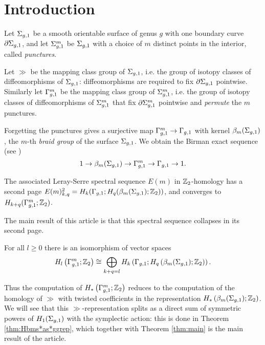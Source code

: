 \section{Introduction}
Let $\Sigma_{g,1}$ be a smooth orientable surface of genus $g$ with one boundary curve $\partial\Sigma_{g,1}$, and let $\Sigma_{g,1}^m$ be $\Sigma_{g,1}$ with
a choice of $m$ distinct points in the interior, called \emph{punctures}.

Let $\gg$ be the mapping class group of $\Sigma_{g,1}$, i.e. the group of isotopy classes of diffeomorphisms of $\Sigma_{g,1}$:
diffeomorphisms are required to fix $\partial\Sigma_{g,1}$ pointwise. Similarly let $\Gamma_{g,1}^m$ be the mapping class group of $\Sigma_{g,1}^m$, i.e.
the group of isotopy classes of diffeomorphisms of $\Sigma_{g,1}^m$ that fix $\partial\Sigma_{g,1}^m$ pointwise and \emph{permute} the $m$ punctures.

Forgetting the punctures gives a surjective map $\Gamma_{g,1}^m\to\Gamma_{g,1}$ with kernel $\beta_{m}(\Sigma_{g,1})$,
the $m$-th \emph{braid group} of the surface $\Sigma_{g,1}$. We obtain the Birman exact sequence (see \cite{Birman:mcgbr})
\begin{equation}
\label{eq:Birman}
1\to\beta_{m}(\Sigma_{g,1})\to\Gamma_{g,1}^m\to\Gamma_{g,1}\to 1.
\end{equation}

The associated Leray-Serre spectral sequence $E(m)$ in $\mathbb{Z}_2$-homology has a second page $E(m)^2_{k,q}=H_k(\Gamma_{g,1};H_q(\beta_{m}(\Sigma_{g,1});\mathbb{Z}_2))$,
and converges to $H_{k+q}(\Gamma_{g,1}^m;\mathbb{Z}_2)$.

The main result of this article is that this spectral sequence collapses in its second page.
\begin{thm}
\label{thm:main}
For all $l\geq 0$ there is an isomorphism of vector spaces
\begin{equation}
\label{eq:main}
H_l\left(\Gamma_{g,1}^m;\mathbb{Z}_2\right)\cong \bigoplus_{k+q=l} H_k\left(\Gamma_{g,1};H_q\left(\beta_{m}(\Sigma_{g,1});\mathbb{Z}_2\right)\right).
\end{equation}
\end{thm}
Thus the computation of $H_*\left(\Gamma_{g,1}^m;\mathbb{Z}_2\right)$ reduces to the computation of the homology of $\gg$ with
twisted coefficients in the representation $H_*\left(\beta_{m}(\Sigma_{g,1});\mathbb{Z}_2\right)$. We will see that this $\gg$-representation
splits as a direct sum of symmetric powers of $H_1(\Sigma_{g,1})$ with the symplectic action: this is done in
Theorem \ref{thm:Hbms*as*ggrep}, which together with Theorem \ref{thm:main} is the main result of the article.

